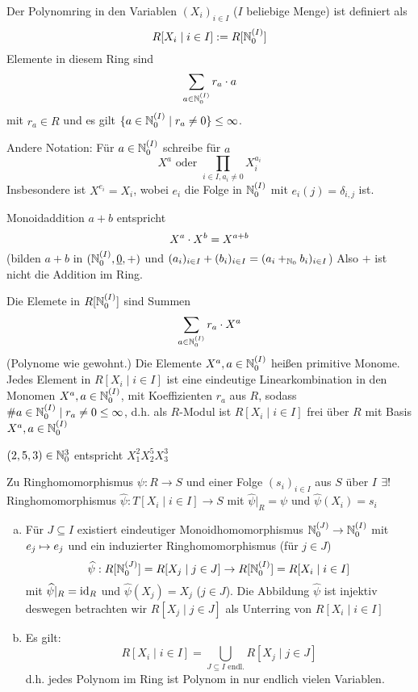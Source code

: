 \documentclass[a4paper]{report}
\begin{document}
\begin{defi}
  Der Polynomring in den Variablen $(X_{i})_{i \in I}$ ($I$ beliebige Menge) ist definiert als
  \[R[X_{i} \mid i \in I] := R[\mathbb{N}_0^{(I)}]\]
  Elemente in diesem Ring sind
  \[\sum_{a \in \mathbb{N}_0^{(I)}}r_{a}\cdot a\]
  mit $r_{a} \in R$ und es gilt $\{a \in \mathbb{N}_0^{(I)} \mid r_{a} \ne 0\} \le \infty$.
\end{defi}
\begin{nota*}
  Andere Notation: Für $a \in \mathbb{N}_0^{(I)}$ schreibe für $a$ \[X^{a} \text{ oder } \prod_{i \in I, a_{i} \ne 0} X_{i}^{a_{i}}\]
  Insbesondere ist \(X^{e_{i}} = X_{i}\), wobei $e_{i}$ die Folge in $\mathbb{N}_0^{(I)}$ mit $e_{i}(j) = \delta_{i,j}$ ist.
  \item Monoidaddition $a + b$ entspricht \[X^{a} \cdot X^{b} = X^{a + b}\]
  (bilden $a + b$ in $(\mathbb{N}_0^{(I)}, \underline 0, +)$ und $(a_{i})_{i \in I} + (b_{i})_{i \in I} = (a_{i} +_{\mathbb{N}_0} b_{i})_{i \in I}$) Also $+$ ist nicht die Addition im Ring.
\end{nota*}
\begin{defi*}
Die Elemete in $R[\mathbb{N}_0^{(I)}]$ sind Summen \[\sum_{a \in \mathbb{N}_0^{(I)}}r_{a} \cdot X^{a}\] (Polynome wie gewohnt.) Die Elemente $X^{a}, a \in \mathbb{N}_0^{(I)}$ heißen primitive Monome. Jedes Element in $R[X_{i} \mid i \in I]$ ist eine eindeutige Linearkombination in den Monomen $X^{a}, a \in \mathbb{N}_0^{(I)}$, mit Koeffizienten $r_{a}$ aus $R$, sodass $\#{a \in \mathbb{N}_0^{(I)} \mid r_{a} \ne 0} \le \infty$, d.h. als $R$-Modul ist $R[X_{i} \mid i \in I]$ frei über $R$ mit Basis $X^{a}, a \in \mathbb{N}_0^{(I)}$
\end{defi*}
\begin{bsp*}
$(2, 5, 3) \in \mathbb{N}_0^{3}$ entspricht $X_{1}^{2}X_{2}^{5}X_{3}^{3}$
\end{bsp*}

\begin{satz} Zu Ringhomomorphismus $\psi : R \to S$ und einer Folge $(s_{i})_{i \in I}$ aus $S$ über $I$ $\exists !$ Ringhomomorphismus $\hat \psi : T[X_{i}\mid i \in I] \to S$ mit $\hat \psi|_{R} = \psi$ und $\hat \psi(X_{i}) = s_{i}$
\end{satz}

\begin{facts*}\item
\begin{enumerate}[(a)]
  \item Für $J \subseteq I$ existiert eindeutiger Monoidhomomorphismus $\mathbb{N}_0^{(J)} \to \mathbb{N}_0^{(I)}$ mit $e_{j} \mapsto e_{j}$ und ein induzierter Ringhomomorphismus (für $j \in J$) \[\widehat \psi: R[\mathbb{N}_0^{(J)}] = R[X_{j} \mid j \in J] \to R[\mathbb{N}_0^{(I)}] = R[X_{i} \mid i \in I]\]
        mit $\widehat \psi|_{R} = \operatorname{id}_{R}$ und $\hat \psi (X_{j}) = X_{j}$ ($j \in J$). Die Abbildung $\hat \psi$ ist injektiv deswegen betrachten wir $R[X_{j} \mid j \in J]$ als Unterring von $R[X_{i} \mid i \in I]$
  \item Es gilt: \[R[X_{i} \mid i \in I] = \bigcup_{J \subseteq I \text{ endl.}} R[X_{j} \mid j \in J]\]
        d.h. jedes Polynom im Ring ist Polynom in nur endlich vielen Variablen.
\end{enumerate}
\end{facts*}
\end{document}
